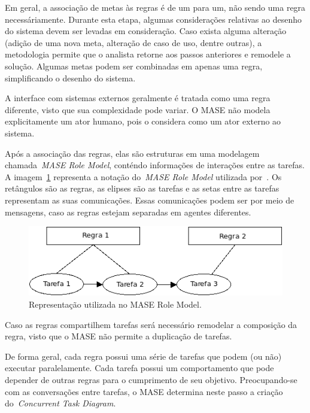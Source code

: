 Em geral, a associação de metas às regras é de um para um, não sendo uma regra necessáriamente. Durante esta etapa, algumas considerações relativas ao desenho do sistema devem ser levadas em consideração. Caso exista alguma alteração (adição de uma nova meta, alteração de caso de uso, dentre outras), a metodologia permite que o analista retorne aos passos anteriores e remodele a solução. Algumas metas podem ser combinadas em apenas uma regra, simplificando o desenho do sistema.

A interface com sistemas externos geralmente é tratada como uma regra diferente, visto que sua complexidade pode variar. O MASE não modela explicitamente um ator humano, pois o considera como um ator externo ao sistema.

Após a associação das regras, elas são estruturas em uma modelagem chamada~\emph{MASE Role Model}, conténdo informações de interações entre as tarefas. A imagem~\ref{fig:exemplo-mase-role-model} representa a notação do~\emph{MASE Role Model} utilizada por~\cite{scott01}. Os retângulos são as regras, as elipses são as tarefas e as setas entre as tarefas representam as suas comunicações. Essas comunicações podem ser por meio de mensagens, caso as regras estejam separadas em agentes diferentes.

\begin{figure}
	\centering
	\includegraphics[scale=0.65]{images/exemplo-mase-role-model.png}
	\caption{Representação utilizada no MASE Role Model.}
	\label{fig:exemplo-mase-role-model}
\end{figure}

Caso as regras compartilhem tarefas será necessário remodelar a composição da regra, visto que o MASE não permite a duplicação de tarefas. 

De forma geral, cada regra possui uma série de tarefas que podem (ou não) executar paralelamente. Cada tarefa possui um comportamento que pode depender de outras regras para o cumprimento de seu objetivo. Preocupando-se com as conversações entre tarefas, o MASE determina neste passo a criação do~\emph{Concurrent Task Diagram}.

